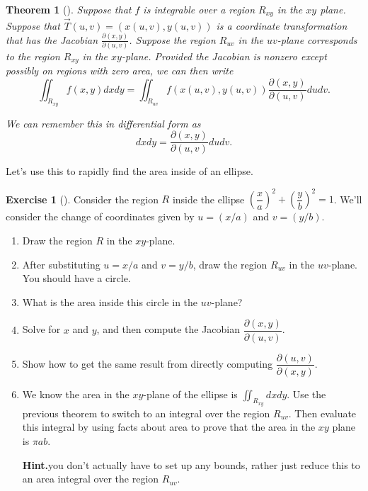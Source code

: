 \documentclass[10pt,]{book}
\theoremstyle{plain}
\newtheorem{theorem}{Theorem}[section]
\theoremstyle{definition}
\theoremstyle{definition}
\theoremstyle{definition}
\theoremstyle{definition}
\newtheorem{exploration}[project]{Exercise}
\theoremstyle{definition}
\numberwithin{equation}{section}
\newcommand{\ds}{\displaystyle}
\begin{document}
\begin{theorem}[{}]\label{theorem-11}
Suppose that \(f\) is integrable over a region \(R_{xy}\) in the \(xy\) plane. Suppose that \(\vec T(u,v)=(x(u,v),y(u,v))\) is a coordinate transformation that has the Jacobian \(\ds \frac{\partial (x,y)}{\partial (u,v)}\). Suppose the region \(R_{uv}\) in the \(uv\)-plane corresponds to the region \(R_{xy}\) in the \(xy\)-plane. Provided the Jacobian is nonzero except possibly on regions with zero area, we can then write%
\begin{equation*}
\iint_{R_{xy}} f(x,y) dxdy = \iint_{R_{uv}} f(x(u,v),y(u,v)) \frac{\partial (x,y)}{\partial (u,v)} dudv.
\end{equation*}
%
\par
We can remember this in differential form as%
\begin{equation*}
dxdy = \frac{\partial (x,y)}{\partial (u,v)} dudv.
\end{equation*}
%
\end{theorem}
Let's use this to rapidly find the area inside of an ellipse.%
\begin{exploration}[]\label{exploration-267}
Consider the region \(R\) inside the ellipse \(\left(\dfrac{x}{a}\right)^2+\left(\dfrac{y}{b}\right)^2=1\). We'll consider the change of coordinates given by \(u=(x/a)\) and \(v=(y/b)\).%
\begin{enumerate}[font=\bfseries,label=(\alph*),ref=\alph*]
\item\label{task-734} Draw the region \(R\) in the \(xy\)-plane.%
\item\label{task-735} After substituting \(u=x/a\) and \(v=y/b\), draw the region \(R_{uv}\) in the \(uv\)-plane.  You should have a circle.%
\item\label{task-736} What is the area inside this circle in the \(uv\)-plane?%
\item\label{task-737} Solve for \(x\) and \(y\), and then compute the Jacobian  \(\dfrac{\partial (x,y)}{\partial (u,v)}\).%
\item\label{task-738} Show how to get the same result from directly computing \(\dfrac{\partial (u,v)}{\partial (x,y)}\).%
\item\label{task-739} We know the area in the \(xy\)-plane of the ellipse is \(\iint_{R_{xy}} dxdy\). Use the previous theorem to switch to an integral over the region \(R_{uv}\).  Then evaluate this integral by using facts about area to prove that the area in the \(xy\) plane is \(\pi a b\).%
\par\medskip\noindent%
\textbf{Hint.}\quad you don't actually have to set up any bounds, rather just reduce this to an area integral over the region \(R_{uv}\).%
\end{enumerate}
\end{exploration}
\end{document}
